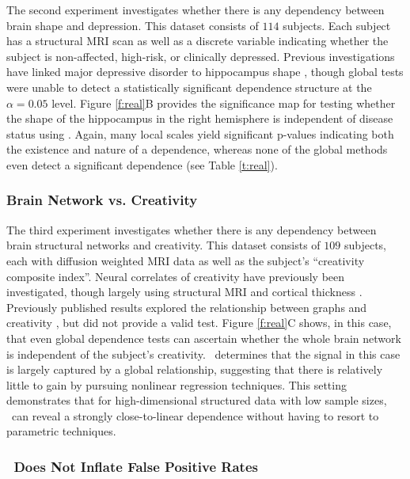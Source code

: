 \documentclass[11pt]{article}
\begin{document}
The second experiment investigates whether there is any dependency between brain shape and depression. 
This  dataset consists of $114$ subjects. Each subject has a structural MRI scan as well as a discrete variable indicating whether the subject is non-affected, high-risk, or clinically depressed.  
% 
Previous investigations have linked major depressive disorder to hippocampus shape \cite{ParkEtAl2008,PosenerEtAl2003}, though global tests were unable to detect a statistically significant dependence structure at the $\alpha=0.05$ level.
% 
Figure \ref{f:real}{\color{magenta}B} provides the significance map for testing whether the shape of the hippocampus in the right hemisphere is independent of disease status using \Mgc. Again, many local scales yield significant p-values indicating both the existence and nature of a dependence, whereas none of the global methods even detect a significant dependence  (see Table \ref{t:real}). 



\subsubsection*{Brain Network vs. Creativity}

The third experiment investigates whether there is any dependency between brain structural networks and creativity.  
% 
This dataset consists of $109$ subjects, each with diffusion weighted MRI data as well as the subject's ``creativity composite index''. 
Neural correlates of creativity have previously been investigated, though largely using structural MRI and cortical thickness \cite{Jung2009}.  Previously published results explored the relationship between graphs and  creativity \cite{Koutra15a}, but did not provide a valid test. 
% 
Figure \ref{f:real}{\color{magenta}C} shows, in this case,  that even global dependence tests can ascertain whether the whole brain network is independent of the subject's creativity.  \Mgc~determines that the signal in this case is largely captured by a global relationship, suggesting that there is relatively little to gain by pursuing nonlinear regression techniques. This setting demonstrates that for high-dimensional structured data with low sample sizes, \Mgc~can  reveal a strongly close-to-linear dependence without having to resort to parametric techniques.


\subsubsection*{\Mgc~Does Not Inflate False Positive Rates} 
\end{document}
